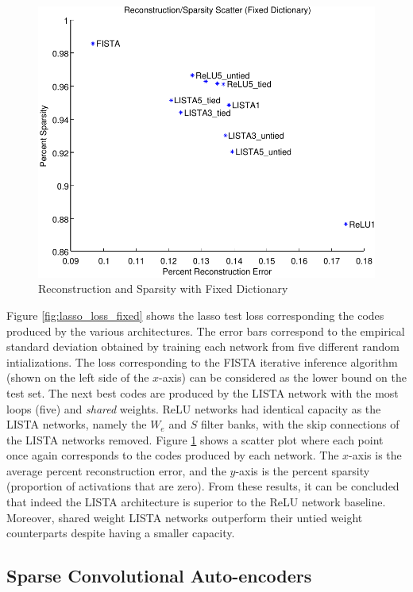 \begin{figure} \centering
\includegraphics[scale=0.75]{./figures/LISTA/fixed_decoder_scatter.pdf}
\caption{Reconstruction and Sparsity with Fixed Dictionary} \label{fig:scatter_fixed} \end{figure}  
Figure \ref{fig:lasso_loss_fixed} shows the lasso test loss corresponding the
codes produced by the various architectures.  The error bars correspond to the
empirical standard deviation obtained by training each network from five
different random intializations.  The loss corresponding to the FISTA iterative
inference algorithm (shown on the left side of the $x$-axis) can be considered
as the lower bound on the test set. The next best codes are produced by the
LISTA network with the most loops (five) and \emph{shared} weights. ReLU
networks had identical capacity as the LISTA networks, namely the $W_e$ and $S$
filter banks, with the skip connections of the LISTA networks removed. Figure
\ref{fig:scatter_fixed} shows a scatter plot where each point once again
corresponds to the codes produced by each network.  The $x$-axis is the average
percent reconstruction error, and the $y$-axis is the percent sparsity
(proportion of activations that are zero).  From these results, it can be
concluded that indeed the LISTA architecture is superior to the ReLU network
baseline. Moreover, shared weight LISTA networks outperform their untied weight
counterparts despite having a smaller capacity.       

\subsection{Sparse Convolutional Auto-encoders}      

